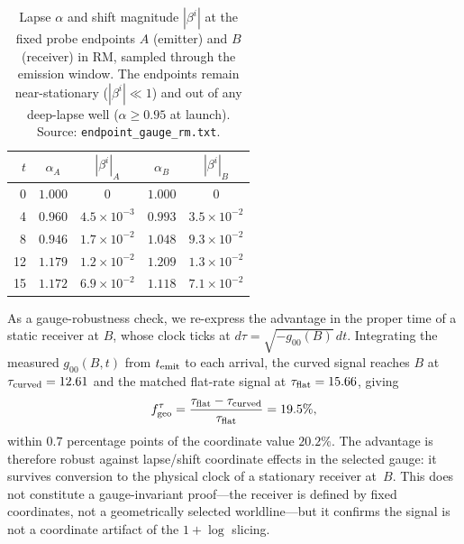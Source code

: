 \documentclass[twocolumn,floatfix,aps,prd,nofootinbib]{revtex4-2}
\begin{document}
\begin{table}[tbp]
\caption{Lapse $\alpha$ and shift magnitude $|\beta^i|$ at the fixed probe
endpoints $A$ (emitter) and $B$ (receiver) in RM, sampled through the emission
window. The endpoints remain near-stationary ($|\beta^i|\ll1$) and out of any
deep-lapse well ($\alpha\ge0.95$ at launch).
Source: \texttt{endpoint\_gauge\_rm.txt}.}
\label{tab:endpoint_gauge}
\begin{ruledtabular}
\begin{tabular}{rcccc}
$t$ & $\alpha_A$ & $|\beta^i|_A$ & $\alpha_B$ & $|\beta^i|_B$ \\
\hline
 0 & $1.000$ & $0$                  & $1.000$ & $0$ \\
 4 & $0.960$ & $4.5\times10^{-3}$   & $0.993$ & $3.5\times10^{-2}$ \\
 8 & $0.946$ & $1.7\times10^{-2}$   & $1.048$ & $9.3\times10^{-2}$ \\
12 & $1.179$ & $1.2\times10^{-2}$   & $1.209$ & $1.3\times10^{-2}$ \\
15 & $1.172$ & $6.9\times10^{-2}$   & $1.118$ & $7.1\times10^{-2}$ \\
\end{tabular}
\end{ruledtabular}
\end{table}

As a gauge-robustness check, we re-express the advantage in the proper time of
a static receiver at $B$, whose clock ticks at $d\tau=\sqrt{-g_{00}(B)}\,dt$.
Integrating the measured $g_{00}(B,t)$ from $t_{\rm emit}$ to each arrival, the
curved signal reaches $B$ at $\tau_{\rm curved}=12.61$ and the matched
flat-rate signal at $\tau_{\rm flat}=15.66$, giving
\begin{equation}
f_{\rm geo}^{\tau}=\frac{\tau_{\rm flat}-\tau_{\rm curved}}{\tau_{\rm flat}}
=19.5\%,
\label{eq:proper_time_fgeo}
\end{equation}
within $0.7$ percentage points of the coordinate value $20.2\%$. The advantage
is therefore robust against lapse/shift coordinate effects in the selected
gauge: it survives conversion to the physical clock of a stationary receiver
at~$B$. This does not constitute a gauge-invariant proof---the receiver is
defined by fixed coordinates, not a geometrically selected worldline---but
it confirms the signal is not a coordinate artifact of the $1+\log$ slicing.
\end{document}
